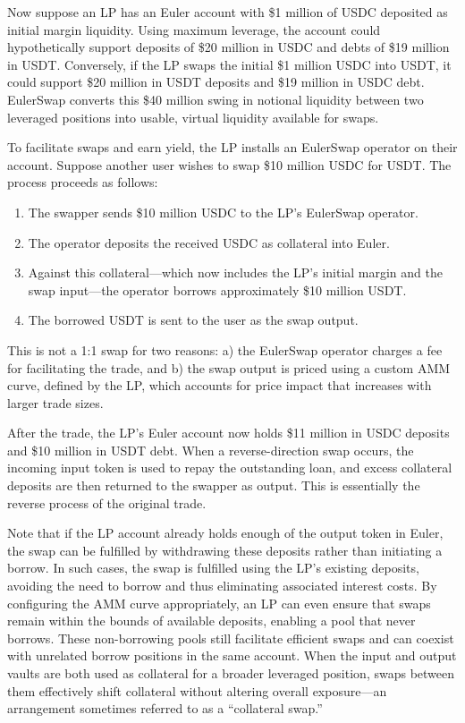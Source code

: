 \documentclass{article}
\begin{document}
Now suppose an LP has an Euler account with \$1 million of USDC deposited as initial margin liquidity. Using maximum leverage, the account could hypothetically support deposits of \$20 million in USDC and debts of \$19 million in USDT. Conversely, if the LP swaps the initial \$1 million USDC into USDT, it could support \$20 million in USDT deposits and \$19 million in USDC debt. EulerSwap converts this \$40 million swing in notional liquidity between two leveraged positions into usable, virtual liquidity available for swaps.

To facilitate swaps and earn yield, the LP installs an EulerSwap operator on their account. Suppose another user wishes to swap \$10 million USDC for USDT. The process proceeds as follows:

\begin{enumerate}
\item The swapper sends \$10 million USDC to the LP's EulerSwap operator.
\item The operator deposits the received USDC as collateral into Euler.
\item Against this collateral—which now includes the LP's initial margin and the swap input—the operator borrows approximately \$10 million USDT.
\item The borrowed USDT is sent to the user as the swap output.
\end{enumerate}

\quad
This is not a 1:1 swap for two reasons: a) the EulerSwap operator charges a fee for facilitating the trade, and b) the swap output is priced using a custom AMM curve, defined by the LP, which accounts for price impact that increases with larger trade sizes.

After the trade, the LP's Euler account now holds \$11 million in USDC deposits and \$10 million in USDT debt. When a reverse-direction swap occurs, the incoming input token is used to repay the outstanding loan, and excess collateral deposits are then returned to the swapper as output. This is essentially the reverse process of the original trade.

Note that if the LP account already holds enough of the output token in Euler, the swap can be fulfilled by withdrawing these deposits rather than initiating a borrow. In such cases, the swap is fulfilled using the LP's existing deposits, avoiding the need to borrow and thus eliminating associated interest costs. By configuring the AMM curve appropriately, an LP can even ensure that swaps remain within the bounds of available deposits, enabling a pool that never borrows. These non-borrowing pools still facilitate efficient swaps and can coexist with unrelated borrow positions in the same account. When the input and output vaults are both used as collateral for a broader leveraged position, swaps between them effectively shift collateral without altering overall exposure—an arrangement sometimes referred to as a ``collateral swap.''
\end{document}
